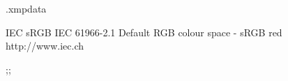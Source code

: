 \RequirePackage{filecontents}
\begin{filecontents*}{\jobname.xmpdata}
	 \maketitle
{}
{IEC sRGB}
{IEC 61966-2.1 Default RGB colour space - sRGB} red
{http://www.iec.ch}
\end{filecontents*};;


\newcommand\EncryptoPrintTitle{Securely Realizing Output Privacy in MPC} %
\newcommand\EncryptoSupervisor{M.Sc. Helen Möllering \\ M.Sc. Oleksandr Tkachenko}

\newcommand\EncryptoAuthor{Liang Zhao}

\documentclass[paper = a4,
		headings = normal,
		headsepline,
		parskip = half,
		listof = totoc,
		bibliography = totoc,
		numbers = noendperiod,
		titlepage = firstiscover,
		captions = tableheading, %
		toc = indentunnumbered
	]
	{scrreprt}



\usepackage[]{encryptothesis}
\usepackage{upgreek}
\usepackage{placeins}


\usepackage{amsmath}
\usepackage{bm}



\usepackage{booktabs} %
\usepackage{siunitx} %
\usepackage{pgfplotstable} %

\usepackage{pgfplots}

